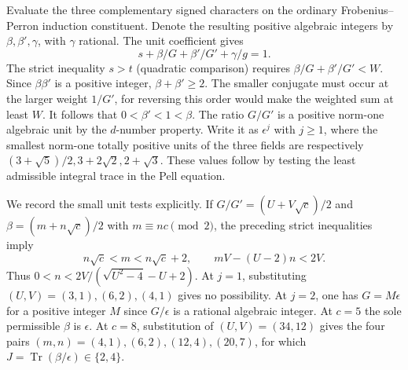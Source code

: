 \documentclass[11pt,a4paper]{article}
\numberwithin{equation}{section}
\begin{document}
Evaluate the three complementary signed characters on the ordinary
Frobenius--Perron induction constituent. Denote the resulting positive
algebraic integers by $\beta,\beta',\gamma$, with $\gamma$ rational.
The unit coefficient gives
\[
 s+\beta/G+\beta'/G'+\gamma/g=1.
\]
The strict inequality $s>t$ (quadratic comparison) requires
$\beta/G+\beta'/G'<W$. Since $\beta\beta'$ is a positive integer, $\beta+\beta'\ge2$. The smaller conjugate must occur at the larger weight $1/G'$, for reversing this order would make the weighted sum at least $W$. It follows that $0<\beta'<1<\beta$.
The ratio $G/G'$ is a positive norm-one algebraic unit by the
$d$-number property. Write it as $\epsilon^j$ with $j\ge1$, where
the smallest norm-one totally positive units of the three fields are
respectively $(3+\sqrt5)/2,3+2\sqrt2,2+\sqrt3$. These values follow by
testing the least admissible integral trace in the Pell equation.

We record the small unit tests explicitly. If
$G/G'=(U+V\sqrt c)/2$ and $\beta=(m+n\sqrt c)/2$ with
$m\equiv nc\pmod 2$, the preceding strict inequalities imply
\[
  n\sqrt c<m<n\sqrt c+2,\qquad mV-(U-2)n<2V.
\]
Thus $0<n<2V/(\sqrt{U^2-4}-U+2)$. At $j=1$, substituting
$(U,V)=(3,1),(6,2),(4,1)$ gives no possibility. At $j=2$, one has
$G=M\epsilon$ for a positive integer $M$ since $G/\epsilon$ is a
rational algebraic integer. At $c=5$ the sole permissible $\beta$
is $\epsilon$. At $c=8$, substitution of $(U,V)=(34,12)$ gives the
four pairs $(m,n)=(4,1),(6,2),(12,4),(20,7)$, for which
$J=\operatorname{Tr}(\beta/\epsilon)\in\{2,4\}$.
\end{document}
